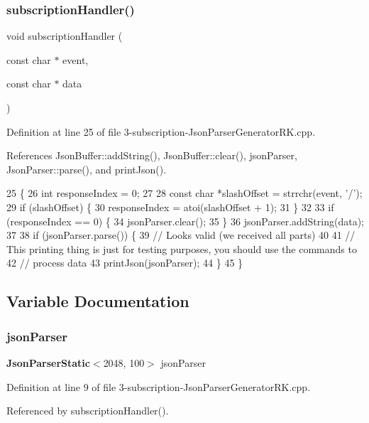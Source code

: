\subsubsection{subscription\+Handler()}
{\footnotesize\ttfamily void subscription\+Handler (\begin{DoxyParamCaption}\item[{const char $\ast$}]{event,  }\item[{const char $\ast$}]{data }\end{DoxyParamCaption})}



Definition at line 25 of file 3-\/subscription-\/\+Json\+Parser\+Generator\+R\+K.\+cpp.



References Json\+Buffer\+::add\+String(), Json\+Buffer\+::clear(), json\+Parser, Json\+Parser\+::parse(), and print\+Json().


\begin{DoxyCode}
25                                                               \{
26     \textcolor{keywordtype}{int} responseIndex = 0;
27 
28     \textcolor{keyword}{const} \textcolor{keywordtype}{char} *slashOffset = strrchr(event, \textcolor{charliteral}{'/'});
29     \textcolor{keywordflow}{if} (slashOffset) \{
30         responseIndex = atoi(slashOffset + 1);
31     \}
32 
33     \textcolor{keywordflow}{if} (responseIndex == 0) \{
34         jsonParser.clear();
35     \}
36     jsonParser.addString(data);
37 
38     \textcolor{keywordflow}{if} (jsonParser.parse()) \{
39         \textcolor{comment}{// Looks valid (we received all parts)}
40 
41         \textcolor{comment}{// This printing thing is just for testing purposes, you should use the commands to}
42         \textcolor{comment}{// process data}
43         printJson(jsonParser);
44     \}
45 \}
\end{DoxyCode}


\subsection{Variable Documentation}
\mbox{\label{3-subscription-_json_parser_generator_r_k_8cpp_af1c065455ff8e2f533af5dd925c8469d}} 
\subsubsection{json\+Parser}
{\footnotesize\ttfamily \textbf{ Json\+Parser\+Static}$<$2048, 100$>$ json\+Parser}



Definition at line 9 of file 3-\/subscription-\/\+Json\+Parser\+Generator\+R\+K.\+cpp.



Referenced by subscription\+Handler().

